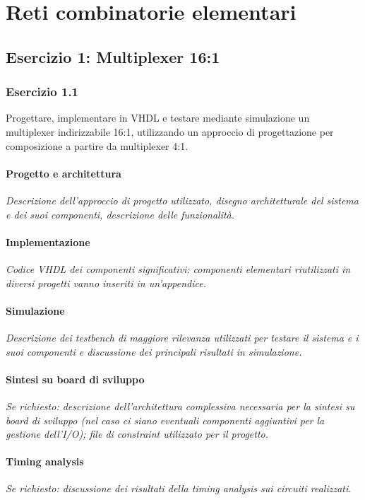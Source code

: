 \documentclass[../main.tex]{subfiles}
\begin{document}
\chapter{Reti combinatorie elementari}

\section*{Esercizio 1: Multiplexer 16:1}

\subsection*{Esercizio 1.1}
Progettare, implementare in VHDL e testare mediante simulazione un multiplexer indirizzabile 16:1, utilizzando un approccio di progettazione per composizione a partire da multiplexer 4:1.

\subsubsection*{Progetto e architettura}
\textit{Descrizione dell’approccio di progetto utilizzato, disegno architetturale del sistema e dei suoi componenti, descrizione delle funzionalità.}

\subsubsection*{Implementazione}
\textit{Codice VHDL dei componenti significativi: componenti elementari riutilizzati in diversi progetti vanno inseriti in un’appendice.}

\subsubsection*{Simulazione}
\textit{Descrizione dei testbench di maggiore rilevanza utilizzati per testare il sistema e i suoi componenti e discussione dei principali risultati in simulazione.}

\subsubsection*{Sintesi su board di sviluppo}
\textit{Se richiesto: descrizione dell’architettura complessiva necessaria per la sintesi su board di sviluppo (nel caso ci siano eventuali componenti aggiuntivi per la gestione dell’I/O); file di constraint utilizzato per il progetto.}

\subsubsection*{Timing analysis}
\textit{Se richiesto: discussione dei risultati della timing analysis sui circuiti realizzati.}
\end{document}
